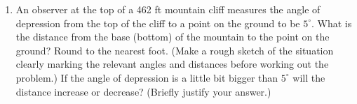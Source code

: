\begin{enumerate}
\clearpage

\item An observer at the top of a 462 ft mountain cliff measures the
  angle of depression from the top of the cliff to a point on the
  ground to be $5^\circ$.  What is the distance from the base (bottom)
  of the mountain to the point on the ground?  Round to the nearest
  foot. (Make a rough sketch of the situation clearly marking the
  relevant angles and distances before working out the problem.) If
  the angle of depression is a little bit bigger than $5^\circ$ will
  the distance increase or decrease? (Briefly justify your answer.)

  \vfill






\end{enumerate}




